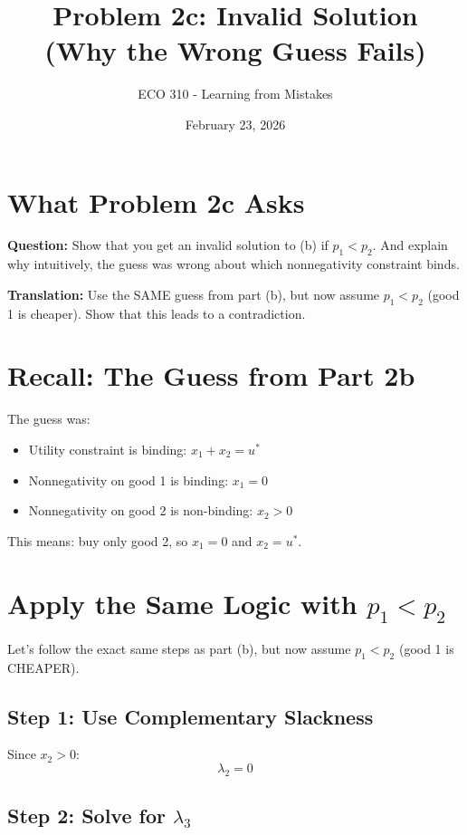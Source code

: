 \documentclass[11pt]{article}
\title{Problem 2c: Invalid Solution \\ (Why the Wrong Guess Fails)}
\author{ECO 310 - Learning from Mistakes}
\date{February 23, 2026}
\begin{document}
\maketitle

\section{What Problem 2c Asks}

\textbf{Question:} Show that you get an invalid solution to (b) if $p_1 < p_2$. And explain why intuitively, the guess was wrong about which nonnegativity constraint binds.

\textbf{Translation:} Use the SAME guess from part (b), but now assume $p_1 < p_2$ (good 1 is cheaper). Show that this leads to a contradiction.

\section{Recall: The Guess from Part 2b}

The guess was:
\begin{itemize}
\item Utility constraint is binding: $x_1 + x_2 = u^*$
\item Nonnegativity on good 1 is binding: $x_1 = 0$
\item Nonnegativity on good 2 is non-binding: $x_2 > 0$
\end{itemize}

This means: buy only good 2, so $x_1 = 0$ and $x_2 = u^*$.

\section{Apply the Same Logic with $p_1 < p_2$}

Let's follow the exact same steps as part (b), but now assume $p_1 < p_2$ (good 1 is CHEAPER).

\subsection{Step 1: Use Complementary Slackness}

Since $x_2 > 0$:
\begin{equation}
\lambda_2 = 0
\end{equation}

\subsection{Step 2: Solve for $\lambda_3$}
\end{document}

